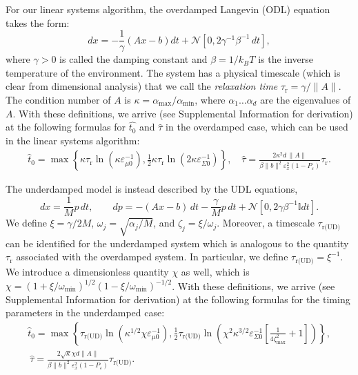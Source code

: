 \documentclass[prx,onecolumn,floatfix,longbibliography,notitlepage, nofootinbib,12pt]{revtex4-2}
\begin{document}
For our linear systems algorithm, the overdamped Langevin (ODL) equation takes the form:
\begin{equation}
    \label{eq:ODLdynamics_main}
    dx = - \frac{1}{\gamma}(A x - b) dt +\mathcal{N}\left[0,2\gamma^{-1}\beta^{-1}\, dt\right],
\end{equation}
where $\gamma >0$ is called the damping constant and $\beta = 1/k_B T$ is the inverse temperature of the environment. The system has a physical timescale (which is clear from dimensional analysis) that we call the \emph{relaxation time} $\tau_\text{r} = \gamma/\|A\|$. The condition number of $A$ is $\kappa = \alpha_\text{max}/\alpha_\text{min}$, where $\alpha_1\dots\alpha_d$ are the eigenvalues of $A$. With these definitions, we arrive (see Supplemental Information for derivation) at the following formulas for $\widehat{t_0}$ and $\widehat{\tau}$ in the overdamped case, which can be used in the linear systems algorithm:
\begin{align}
\label{eq:t0-tau-linear-systems-odl}
\widehat{t}_0 =
 \max \left\{\kappa \tau_\text{r}\ln \left(\kappa \varepsilon^{-1}_{\mu 0}\right),\frac{1}{2} \kappa \tau_\text{r}\ln\left(2\kappa\varepsilon_{\Sigma 0}^{-1}\right)\right\},\quad
    \widehat{\tau} = \frac{2 \kappa^2 d\, \|A\|  }{\beta \|b\|^2 \varepsilon_x^2 (1-P_\varepsilon)}\tau_\text{r}.
\end{align}


The underdamped model is instead described by the UDL equations,
\begin{equation}
\label{eq:UDL-x}
    dx  = \frac{1}{M} p \, dt, \qquad  dp = -(A x - b) \, dt- \frac{\gamma}{M} p \, dt + \mathcal{N}[0,2 \gamma \beta^{-1}  \mathbb{I} dt].
\end{equation}
We define $\xi = \gamma/2M$, $\omega_j = \sqrt{\alpha_j/M}$, and $\zeta_j = \xi/\omega_j$. Moreover, a timescale $\tau_\text{r(UD)}$ can be identified for the underdamped system which is analogous to the quantity $\tau_\text{r}$ associated with the overdamped system. In particular, we define $\tau_{\text{r(UD)}} = \xi^{-1}$. We introduce a dimensionless quantity $\chi$ as well, which is $\chi = (1+ \xi/\omega_\text{min})^{1/2}(1- \xi/\omega_\text{min})^{-1/2}$.
With these definitions, we arrive (see Supplemental Information for derivation) at the following formulas for the timing parameters in the underdamped case:
\begin{multline}
\label{eq:t0-tau-linear-systems-udl}
\widehat{t}_0 =  \max \left\{ \tau_{\text{r(UD)}} \ln \left( \kappa^{1/2}\chi \varepsilon_{\mu 0}^{-1}\right),\frac{1}{2} \tau_\text{r(UD)}\ln\left(\chi^2 \kappa^{3/2}\varepsilon_{\Sigma0}^{-1}\left[\frac{1}{4\zeta_\text{max}^{2}}+1\right]\right)\right\},\\\
    \widehat{\tau} = \frac{2\sqrt{\kappa} \chi d\|A\| }{ \beta \|b\|^2\varepsilon_x^2(1-P_\varepsilon)} \tau_{\text{r(UD)}}.
\end{multline}
\end{document}
